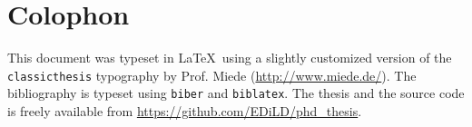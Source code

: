 
\pagestyle{empty}

\hfill

\vfill


\section*{Colophon}
This document was typeset in \LaTeX~using a slightly customized version of the 
\texttt{classicthesis} typography by Prof. Miede (\url{http://www.miede.de/}).
The bibliography is typeset using \texttt{biber} and \texttt{biblatex}.
The thesis and the source code is freely available from \url{https://github.com/EDiLD/phd_thesis}.
